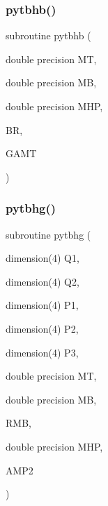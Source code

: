 \subsubsection{\texorpdfstring{pytbhb()}{pytbhb()}}
{\footnotesize\ttfamily subroutine pytbhb (\begin{DoxyParamCaption}\item[{double precision}]{MT,  }\item[{double precision}]{MB,  }\item[{double precision}]{M\+HP,  }\item[{}]{BR,  }\item[{}]{G\+A\+MT }\end{DoxyParamCaption})}

\mbox{\label{pythia-6_84_824_8f_ab37c75f11d388ab995e98e3eca29e81b}} 
\subsubsection{\texorpdfstring{pytbhg()}{pytbhg()}}
{\footnotesize\ttfamily subroutine pytbhg (\begin{DoxyParamCaption}\item[{dimension(4)}]{Q1,  }\item[{dimension(4)}]{Q2,  }\item[{dimension(4)}]{P1,  }\item[{dimension(4)}]{P2,  }\item[{dimension(4)}]{P3,  }\item[{double precision}]{MT,  }\item[{double precision}]{MB,  }\item[{}]{R\+MB,  }\item[{double precision}]{M\+HP,  }\item[{}]{A\+M\+P2 }\end{DoxyParamCaption})}

\mbox{\label{pythia-6_84_824_8f_a8d44a8d8b3450950fbf946b1c29fb42d}} 
